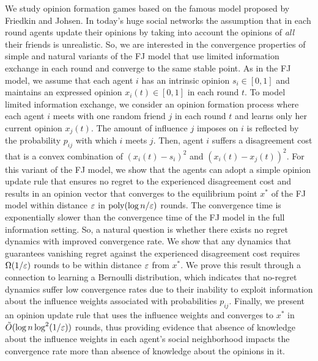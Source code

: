 We study opinion formation games based on the famous model proposed by Friedkin
and Johsen. In today's huge social networks the assumption that in each round
agents update their opinions by taking into account the opinions of \emph{all}
their friends is unrealistic. So, we are interested in the convergence
properties of simple and natural variants of the FJ model that use limited
information exchange in each round and converge to the same stable point.
%
As in the FJ model, we assume that each agent $i$ has an intrinsic opinion $s_i
\in [0,1]$ and maintains an expressed opinion $x_i(t) \in [0,1]$ in each round
$t$. To model limited information exchange, we consider an opinion formation
process where each agent $i$ meets with  one random friend $j$ in each round
$t$ and learns only her current opinion $x_j(t)$. The amount of influence $j$
imposes on $i$ is reflected by the probability $p_{ij}$ with which $i$ meets
$j$. Then, agent $i$ suffers a disagreement cost that is a convex combination
of $(x_i(t) - s_i)^2$ and $(x_i(t) - x_j(t))^2$.
%
For this variant of the FJ model, we show that the agents can adopt a simple
opinion update rule that ensures no regret to the experienced
disagreement cost and results in an opinion vector that converges to the
equilibrium point $x^\ast$ of the FJ model within distance $\varepsilon$ in
$\mathrm{poly}(\log n /\varepsilon)$ rounds.
%
The convergence time is exponentially slower than the convergence time of the
FJ model in the full information setting. So, a natural question is whether
there exists no regret dynamics with improved convergence rate. We show that any
dynamics that guarantees vanishing regret against the experienced disagreement
cost requires $\Omega(1/\varepsilon)$ rounds to be within distance $\varepsilon$ from
$x^{\ast}$. We prove this result through a connection to learning a Bernoulli distribution, 
which indicates that no-regret dynamics suffer low convergence rates due to their inability to
exploit information about the influence weights associated with
probabilities $p_{ij}$. Finally, we present an opinion update rule that 
uses the influence weights and converges to $x^\ast$ in
$\tilde{O}(\log n \log^2(1/\varepsilon))$ rounds, thus providing evidence that absence of knowledge
about the influence weights in each agent's social neighborhood impacts the convergence rate more
than absence of knowledge about the opinions in it.
